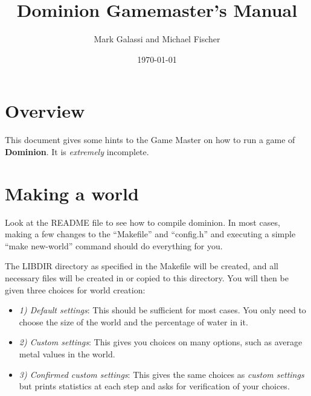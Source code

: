 \pagestyle{headings}



\pagestyle{empty}

\comment %
\comment %


\begin{tex}
\pagestyle{empty}
\title{Dominion Gamemaster's Manual}


\author{Mark Galassi and Michael Fischer}

\date{\today}

\maketitle
\end{tex}

\pagestyle{headings}

\tableofcontents

\chapter{Overview}
This document gives some hints to the Game Master on how to run a game
of {\bf Dominion}.  It is {\em extremely} incomplete.

\chapter{Making a world}

Look at the README file to see how to compile dominion.  In most
cases, making a few changes to the ``Makefile'' and ``config.h'' and
executing a simple ``make new-world'' command should do everything for
you.

The LIBDIR directory as specified in the Makefile will be created, and
all necessary files will be created in or copied to this directory.
You will then be given three choices for world creation:

\begin{itemize}
\item
{\em 1) Default settings}: This should be sufficient for most cases.
You only need to choose the size of the world and the percentage of
water in it.
\item
{\em 2) Custom settings}: This gives you choices on many options, such
as average metal values in the world.
\item
{\em 3) Confirmed custom settings}: This gives the same choices as
{\em custom settings} but prints statistics at each step and asks for
verification of your choices.
\end{itemize}

